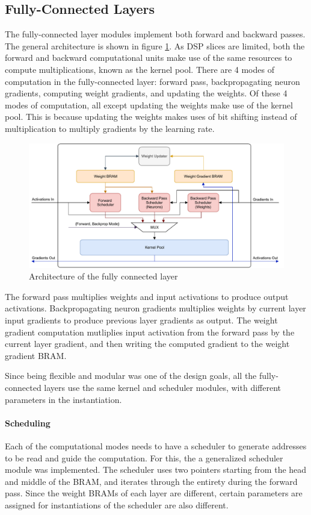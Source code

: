 \subsection{Fully-Connected Layers}
The fully-connected layer modules implement both forward and backward passes. The general architecture is shown in figure \ref{fc-arch}. As DSP slices are limited, both the forward and backward computational units make use of the same resources to compute multiplications, known as the kernel pool. There are 4 modes of computation in the fully-connected layer: forward pass, backpropagating neuron gradients, computing weight gradients, and updating the weights. Of these 4 modes of computation, all except updating the weights make use of the kernel pool. This is because updating the weights makes uses of bit shifting instead of multiplication to multiply gradients by the learning rate.
\begin{figure}
	\centering 
	\includegraphics[width=\textwidth]{figures/fully_connected_arch}
	\caption{Architecture of the fully connected layer}\label{fc-arch}
\end{figure}

The forward pass multiplies weights and input activations to produce output activations. Backpropagating neuron gradients multiplies weights by current layer input gradients to produce previous layer gradients as output. The weight gradient computation mutliplies input activation from the forward pass by the current layer gradient, and then writing the computed gradient to the weight gradient BRAM. 

Since being flexible and modular was one of the design goals, all the fully-connected layers use the same kernel and scheduler modules, with different parameters in the instantiation.

\paragraph{Scheduling}
Each of the computational modes needs to have a scheduler to generate addresses to be read and guide the computation. For this, the a generalized scheduler module was implemented. The scheduler uses two pointers starting from the head and middle of the BRAM, and iterates through the entirety during the forward pass. Since the weight BRAMs of each layer are different, certain parameters are assigned for instantiations of the scheduler are also different.

